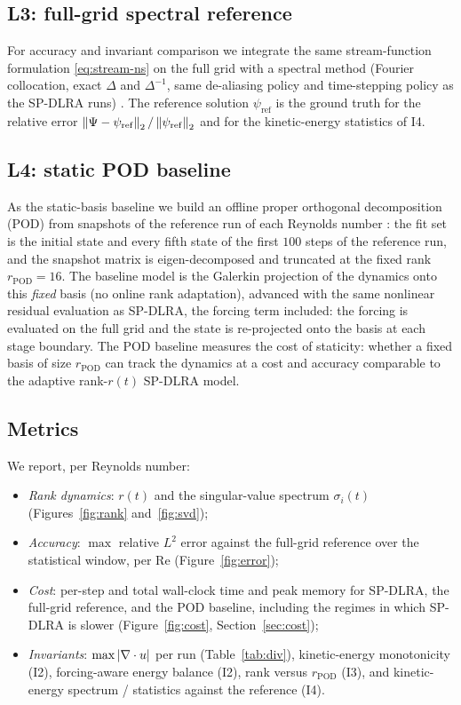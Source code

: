 \subsection{L3: full-grid spectral reference}
\label{sec:reference}

For accuracy and invariant comparison we integrate the same
stream-function formulation \eqref{eq:stream-ns} on the full grid with a
spectral method (Fourier collocation, exact $\Delta$ and $\Delta^{-1}$,
same de-aliasing policy and time-stepping policy as the SP-DLRA runs)
\cite{orszag1971}.
The reference solution $\psi_{\mathrm{ref}}$ is the ground truth for the
relative error
$\left\lVert \Psi - \psi_{\mathrm{ref}} \right\rVert_2 / \left\lVert \psi_{\mathrm{ref}} \right\rVert_2$ and for
the kinetic-energy statistics of I4.

\subsection{L4: static POD baseline}
\label{sec:pod}

As the static-basis baseline we build an offline proper orthogonal
decomposition (POD) from snapshots of the reference run of each
Reynolds number \cite{sirovich1987, lumley1967}: the fit set is the initial
state and every fifth state of the first $100$ steps of the reference run, and
the snapshot matrix is eigen-decomposed and truncated at the fixed rank
$r_{\mathrm{POD}} = 16$. The baseline model is the Galerkin projection of the
dynamics onto this \emph{fixed} basis (no online rank adaptation), advanced
with the same nonlinear residual evaluation as SP-DLRA, the forcing term
included: the forcing is evaluated on the full grid and the state is
re-projected onto the basis at each stage boundary.
The POD baseline measures the cost of staticity: whether a fixed basis of
size $r_{\mathrm{POD}}$ can track the dynamics at a cost and accuracy
comparable to the adaptive rank-$r(t)$ SP-DLRA model.

\subsection{Metrics}
\label{sec:metrics}

We report, per Reynolds number:
\begin{itemize}
  \item \emph{Rank dynamics}: $r(t)$ and the singular-value spectrum
  $\sigma_i(t)$ (Figures~\ref{fig:rank} and~\ref{fig:svd});
  \item \emph{Accuracy}: $\max$ relative $L^2$ error against the
  full-grid reference over the statistical window, per Re
  (Figure~\ref{fig:error});
  \item \emph{Cost}: per-step and total wall-clock time and peak memory for
  SP-DLRA, the full-grid reference, and the POD baseline, including the
  regimes in which SP-DLRA is slower (Figure~\ref{fig:cost},
  Section~\ref{sec:cost});
  \item \emph{Invariants}: $\max|\nabla\cdot u|$ per run (Table~\ref{tab:div}),
  kinetic-energy monotonicity (I2), forcing-aware energy balance (I2), rank
  versus $r_{\mathrm{POD}}$ (I3), and kinetic-energy spectrum / statistics
  against the reference (I4).
\end{itemize}

